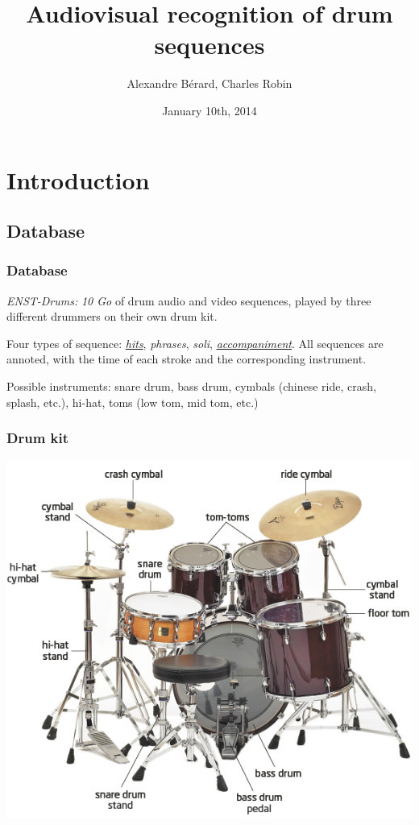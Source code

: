 \documentclass{beamer}
\title[Audiovisual recognition of drum sequences]{Audiovisual recognition of drum sequences}
\author[A.~Bérard, C.~Robin]{Alexandre Bérard, Charles Robin}
\date{January 10th, 2014}
\begin{document}
    \begin{frame}
    \titlepage
    \end{frame}

    \section{Introduction}    
    \subsection{Database}
    \begin{frame}
        \frametitle{Database}
        \emph{ENST-Drums:} \emph{10 Go} of drum audio and video sequences, played by three different drummers on their own drum kit.
        \vspace*{0.5cm}
       
        Four types of sequence: \href{run:hits.wav}{\emph{hits}}, \emph{phrases}, \emph{soli}, \href{run:minusone.wav}{\emph{accompaniment}}. All sequences are annoted, with the time of each stroke and the corresponding instrument.
        \vspace*{0.5cm}

        Possible instruments: snare drum, bass drum, cymbals (chinese ride, crash, splash, etc.), hi-hat, toms (low tom, mid tom, etc.)
    \end{frame}
    
    \begin{frame}
        \frametitle{Drum kit}
        \begin{center}
            \includegraphics[scale=0.35]{drum-kit.jpg}
        \end{center}
    \end{frame}
\end{document}
